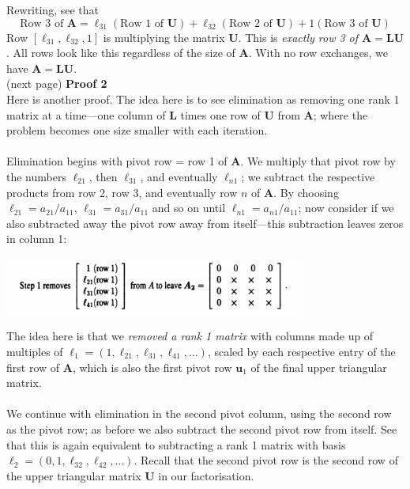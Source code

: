 \documentclass{report}
\begin{document}
Rewriting, see that
\begin{equation*}
\text{Row 3 of $\bm A$}=\ell_{31}(\text{Row 1 of $\bm U$})+\ell_{32}(\text{Row 2 of $\bm U$})+1(\text{Row 3 of $\bm U$})
\end{equation*}
Row $[\ell_{31},\ell_{32},1]$ is multiplying the matrix $\bm U$. This is \textit{exactly row 3 of $\bm A=\bm{LU}$}. All rows look like this regardless of the size of
$\bm A$. With no row exchanges, we have $\bm A=\bm{LU}$.\\
(next page)\newpage
\noindent\textbf{Proof 2}\\
Here is another proof. The idea here is to see elimination as removing one rank 1 matrix at a time---one column of $\bm L$ times one row of $\bm U$ from $\bm A$; 
where the problem becomes one size smaller with each iteration.\\
\vspace{1mm}\\
Elimination begins with pivot row = row 1 of $\bm A$. We multiply that pivot row by the numbers $\ell_{21}$, then $\ell_{31}$, and eventually $\ell_{n1}$; we subtract
the respective products from row 2, row 3, and eventually row $n$ of $\bm A$.
By choosing $\ell_{21}=a_{21}/a_{11}$, $\ell_{31}=a_{31}/a_{11}$ and so on until
$\ell_{n1}=a_{n1}/a_{11}$; now consider
if we also subtracted away the pivot row away from itself---this subtraction leaves zeros in column 1:
\begin{center}
\includegraphics[width=10cm]{9}
\end{center}
The idea here is that we \textit{removed a rank 1 matrix} with columns made up of multiples of $\bm\ell_1=(1,\ell_{21},\ell_{31},\ell_{41},\ldots)$, 
scaled by
each respective entry of the first row of $\bm A$, which is also the first pivot row $\bm u_1$ of the final upper triangular matrix.\\
\vspace{1mm}\\
We continue with elimination in the second pivot column, using the second row as the pivot row; as before we also subtract the second pivot row from itself. 
See that this is again equivalent to subtracting a rank 1 matrix with basis
$\bm\ell_2=(0,1,\ell_{32},\ell_{42},\ldots)$. Recall that the second pivot row is the second row of the upper triangular matrix $\bm U$ in our factorisation.
\end{document}
